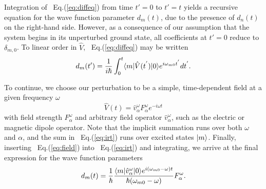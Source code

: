 {{{Integration of ~Eq.(\ref{eq:diffeq}) from time $t' = 0$ to $t' = t$ yields a recursive equation for the 
wave function parameter $d_m(t)$, due to the presence of $d_n(t)$ on the right-hand side. 
However, as a consequence of our assumption that the system begins in its unperturbed ground state, all
coefficients at $t' = 0$ reduce to $\delta_{m,0}$. To linear order in $\hat{V}$, ~Eq.(\ref{eq:diffeq}) may be written
\begin{equation} \label{eq:irt}
    d_m(t') = \frac{1}{i\hbar}\int_0^t\langle m |\hat{V}(t^{'})| 0 \rangle e^{i\omega_{m0}t^{'}}dt^{'}.
\end{equation}

To continue, we choose our perturbation to be a simple, time-dependent field at a given frequency $\omega$ 
\begin{equation} \label{eq:field}
\hat{V}(t) = \hat{v}^\omega_\alpha F^\omega_\alpha e^{-i\omega t}
\end{equation}
with field strength $F^\omega_\alpha$ and arbitrary field operator $\hat{v}^\omega_\alpha$, such as the electric or magnetic dipole operator. 
Note that the implicit summation runs over both $\omega$ and $\alpha$, and the sum in ~Eq.(\ref{eq:irt}) runs over excited states $| m \rangle$.
Finally, inserting ~Eq.(\ref{eq:field}) into ~Eq.(\ref{eq:irt}) and integrating, we arrive at the final expression for the
wave function parameters
\begin{equation} \label{eq:sot}
    \begin{aligned}
        d_m(t) = \frac{1}{\hbar}\frac{\langle m |\hat{v}^\omega_\alpha| 0 \rangle e^{i(\omega_{m0}-\omega)t}}{\hbar(\omega_{m0}-\omega)}F^{\omega}_{\alpha}.
    \end{aligned}
\end{equation}
 
}}}
